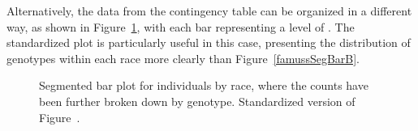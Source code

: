 \newpage

Alternatively, the data from the contingency table can be organized in a different way, as shown in Figure~\ref{famussSegBarPlotB}, with each bar representing a level of . The standardized plot is particularly useful in this case, presenting the distribution of genotypes within each race more clearly than Figure~\ref{famussSegBarB}.

\begin{figure}[h!]
\centering
{}
\caption{ Segmented bar plot for individuals by race, where the counts have been further broken down by genotype.  Standardized version of Figure~.}
\label{famussSegBarPlotB}
\end{figure}

